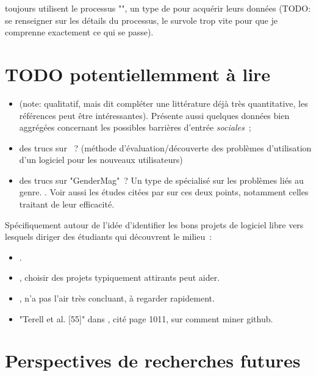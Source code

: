\textcite[p.~1006]{barriers-2018} toujours utilisent le processus "", un type de  pour acquérir leurs données (TODO: se renseigner sur les détails du processus,
\textcite{barriers-2018} le survole trop vite pour que je comprenne exactement ce qui se passe).

\section{TODO potentiellemment à lire}

\begin{itemize}
    \item {} (note: qualitatif, mais dit compléter une littérature déjà très
        quantitative, les références peut être intéressantes). Présente aussi quelques données bien aggrégées
        concernant les possibles barrières d'entrée \emph{sociales} ;
    \item des trucs sur  ? (méthode  d'évaluation/découverte des
        problèmes d'utilisation d'un logiciel pour les nouveaux utilisateurs)
    \item des trucs sur "GenderMag" ? Un type de  spécialisé sur les problèmes liés
        au genre. . Voir aussi les études citées par
        \textcite[p.~1005-1006]{barriers-2018} sur ces deux points, notamment celles traitant de leur
        efficacité.
\end{itemize}

Spécifiquement autour de l'idée d'identifier les bons projets de logiciel libre vers lesquels diriger des
étudiants qui découvrent le milieu :

\begin{itemize}
    \item {}.
    \item {}, choisir des projets typiquement attirants peut aider.
    \item {}, n'a pas l'air très concluant, à regarder rapidement.
    \item "Terell et al. [55]" dans \textcite{barriers-2018}, cité page 1011, sur comment miner github.
\end{itemize}

\section{Perspectives de recherches futures}

